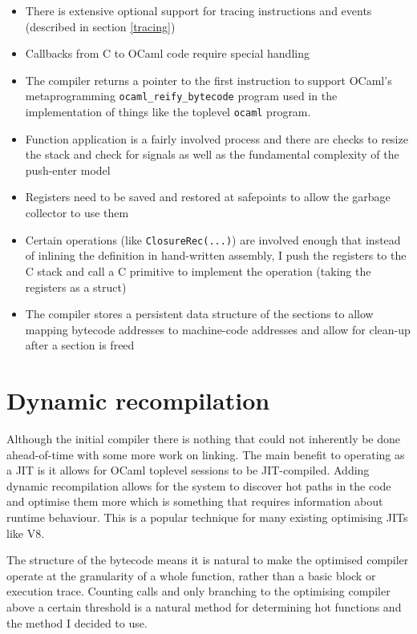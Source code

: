 \begin{itemize}
      \item There is extensive optional support for tracing instructions and events
            (described
            in section \ref{tracing})
      \item Callbacks from C to OCaml code require special handling
      \item The compiler returns a pointer to the first instruction to support OCaml's
            metaprogramming \texttt{ocaml\_reify\_bytecode} program used in the implementation of
            things like the
            toplevel \texttt{ocaml} program.
      \item Function application is a fairly involved process and there are checks to resize the
            stack and check for signals as well as the fundamental complexity of the push-enter
            model
      \item Registers need to be saved and restored at safepoints to allow the garbage collector to
            use them
      \item Certain operations (like \texttt{ClosureRec(...)}) are involved enough that instead of
            inlining the definition in
            hand-written assembly, I push the registers to the C stack and call a C primitive to
            implement the
            operation (taking the registers as a struct)
      \item The compiler stores a persistent data structure of the sections to allow mapping
            bytecode addresses to machine-code addresses and allow for clean-up after a section is
            freed
\end{itemize}

\section{Dynamic recompilation} \label{dyn-recomp}

Although the initial compiler there is nothing that could not inherently be done ahead-of-time with
some more work on linking. The main benefit to operating as a JIT is it allows for OCaml toplevel
sessions to be JIT-compiled. Adding dynamic recompilation allows for the system to discover hot
paths in the code and optimise them more which is something that requires information about runtime
behaviour. This is a popular technique for many existing optimising JITs like V8.

The structure of the bytecode means it is natural to make the optimised compiler operate at the
granularity of a whole function, rather than a basic block or execution trace. Counting calls and
only branching to the optimising compiler above a certain threshold is a natural method for
determining hot functions and the method I decided to use.

